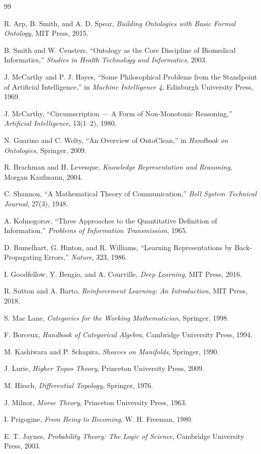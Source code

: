 \documentclass[12pt]{article}
\begin{document}
\begin{thebibliography}{99}

R. Arp, B. Smith, and A. D. Spear,
\emph{Building Ontologies with Basic Formal Ontology},
MIT Press, 2015.

B. Smith and W. Ceusters,
``Ontology as the Core Discipline of Biomedical Informatics,''
\emph{Studies in Health Technology and Informatics}, 2003.

J. McCarthy and P. J. Hayes,
``Some Philosophical Problems from the Standpoint of Artificial Intelligence,''
in \emph{Machine Intelligence 4}, Edinburgh University Press, 1969.

J. McCarthy,
``Circumscription --- A Form of Non-Monotonic Reasoning,''
\emph{Artificial Intelligence}, 13(1–2), 1980.

N. Guarino and C. Welty,
``An Overview of OntoClean,''
in \emph{Handbook on Ontologies}, Springer, 2009.

R. Brachman and H. Levesque,
\emph{Knowledge Representation and Reasoning},
Morgan Kaufmann, 2004.

C. Shannon,
``A Mathematical Theory of Communication,''
\emph{Bell System Technical Journal}, 27(3), 1948.

A. Kolmogorov,
``Three Approaches to the Quantitative Definition of Information,''
\emph{Problems of Information Transmission}, 1965.

D. Rumelhart, G. Hinton, and R. Williams,
``Learning Representations by Back-Propagating Errors,''
\emph{Nature}, 323, 1986.

I. Goodfellow, Y. Bengio, and A. Courville,
\emph{Deep Learning},
MIT Press, 2016.

R. Sutton and A. Barto,
\emph{Reinforcement Learning: An Introduction},
MIT Press, 2018.

S. Mac Lane,
\emph{Categories for the Working Mathematician},
Springer, 1998.

F. Borceux,
\emph{Handbook of Categorical Algebra},
Cambridge University Press, 1994.

M. Kashiwara and P. Schapira,
\emph{Sheaves on Manifolds},
Springer, 1990.

J. Lurie,
\emph{Higher Topos Theory},
Princeton University Press, 2009.

M. Hirsch,
\emph{Differential Topology},
Springer, 1976.

J. Milnor,
\emph{Morse Theory},
Princeton University Press, 1963.

I. Prigogine,
\emph{From Being to Becoming},
W. H. Freeman, 1980.

E. T. Jaynes,
\emph{Probability Theory: The Logic of Science},
Cambridge University Press, 2003.

\end{thebibliography} 
\end{document}
